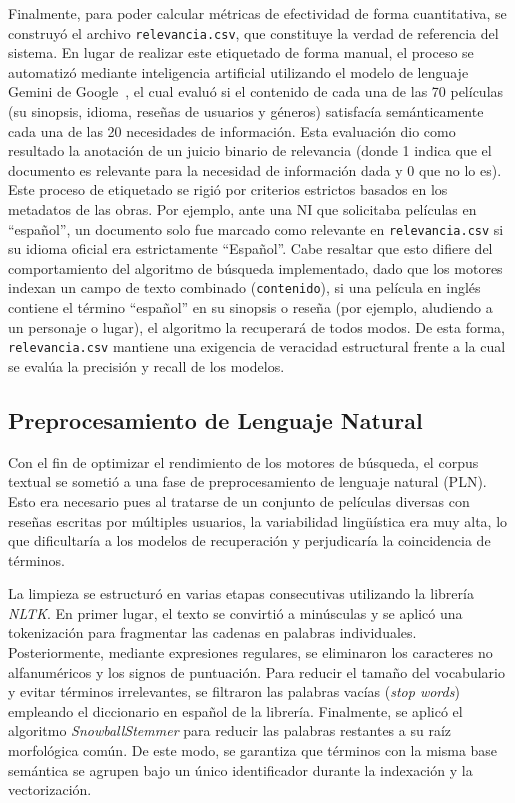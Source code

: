 \documentclass[conference,a4paper]{IEEEtran}
\begin{document}
Finalmente, para poder calcular métricas de efectividad de forma cuantitativa, se construyó el archivo \texttt{relevancia.csv}, que constituye la verdad de referencia del sistema. En lugar de realizar este etiquetado de forma manual, el proceso se automatizó mediante inteligencia artificial utilizando el modelo de lenguaje Gemini de Google~\cite{b6}, el cual evaluó si el contenido de cada una de las 70 películas (su sinopsis, idioma, reseñas de usuarios y géneros) satisfacía semánticamente cada una de las 20 necesidades de información. Esta evaluación dio como resultado la anotación de un juicio binario de relevancia (donde 1 indica que el documento es relevante para la necesidad de información dada y 0 que no lo es). Este proceso de etiquetado se rigió por criterios estrictos basados en los metadatos de las obras. Por ejemplo, ante una NI que solicitaba películas en ``español'', un documento solo fue marcado como relevante en \texttt{relevancia.csv} si su idioma oficial era estrictamente ``Español''. Cabe resaltar que esto difiere del comportamiento del algoritmo de búsqueda implementado, dado que los motores indexan un campo de texto combinado (\texttt{contenido}), si una película en inglés contiene el término ``español'' en su sinopsis o reseña (por ejemplo, aludiendo a un personaje o lugar), el algoritmo la recuperará de todos modos. De esta forma, \texttt{relevancia.csv} mantiene una exigencia de veracidad estructural frente a la cual se evalúa la precisión y recall de los modelos.
\subsection{Preprocesamiento de Lenguaje Natural}
Con el fin de optimizar el rendimiento de los motores de búsqueda, el corpus textual se sometió a una fase de preprocesamiento de lenguaje natural (PLN). Esto era necesario pues al tratarse de un conjunto de películas diversas con reseñas escritas por múltiples usuarios, la variabilidad lingüística era muy alta, lo que dificultaría a los modelos de recuperación y perjudicaría la coincidencia de términos.

La limpieza se estructuró en varias etapas consecutivas utilizando la librería \textit{NLTK}. En primer lugar, el texto se convirtió a minúsculas y se aplicó una tokenización para fragmentar las cadenas en palabras individuales. Posteriormente, mediante expresiones regulares, se eliminaron los caracteres no alfanuméricos y los signos de puntuación. Para reducir el tamaño del vocabulario y evitar términos irrelevantes, se filtraron las palabras vacías (\textit{stop words}) empleando el diccionario en español de la librería. Finalmente, se aplicó el algoritmo \textit{SnowballStemmer} para reducir las palabras restantes a su raíz morfológica común. De este modo, se garantiza que términos con la misma base semántica se agrupen bajo un único identificador durante la indexación y la vectorización. 
\end{document}
